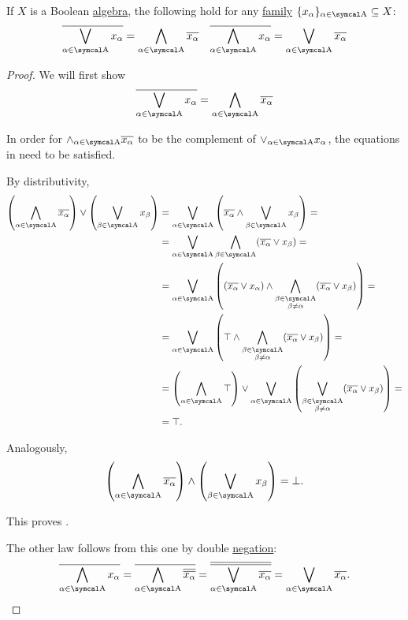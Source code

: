 \begin{theorem}\label{thm:de_morgans_laws}
  If \( X \) is a Boolean \hyperref[def:boolean_algebra]{algebra}, the following hold for any \hyperref[def:indexed_family]{family} \( \{ x_\al \}_{\al \in \CA} \subseteq X \):
  \begin{align*}
    \Ol{\bigvee_{\al \in \CA} x_\al} = \bigwedge_{\al \in \CA} \Ol{x_\al}
    &&
    \Ol{\bigwedge_{\al \in \CA} x_\al} = \bigvee_{\al \in \CA} \Ol{x_\al}
  \end{align*}
\end{theorem}
\begin{proof}
  We will first show
  \begin{equation}\label{thm:de_morgans_laws/equation}
    \Ol{\bigvee_{\al \in \CA} x_\al} = \bigwedge_{\al \in \CA} \Ol{x_\al}
  \end{equation}

  In order for \( \wedge_{\al \in \CA} \Ol{x_\al} \) to be the complement of \( \vee_{\al \in \CA} x_\al \), the equations in  need to be satisfied.

  By distributivity,
  \begin{align*}
    \left( \bigwedge_{\al \in \CA} \Ol{x_\al} \right) \vee \left( \bigvee_{\beta \in \CA} x_\beta \right)
    &=
    \bigvee_{\al \in \CA} \left( \Ol{x_\al} \wedge \bigvee_{\beta \in \CA} x_\beta \right)
    = \\ &=
    \bigvee_{\al \in \CA} \bigwedge_{\beta \in \CA} (\Ol{x_\al} \vee x_\beta)
    = \\ &=
    \bigvee_{\al \in \CA} \left( (\Ol{x_\al} \vee x_\al) \wedge \bigwedge_{\substack{\beta \in \CA \\ \beta \neq \al}} (\Ol{x_\al} \vee x_\beta) \right)
    = \\ &=
    \bigvee_{\al \in \CA} \left( \top \wedge \bigwedge_{\substack{\beta \in \CA \\ \beta \neq \al}} (\Ol{x_\al} \vee x_\beta) \right)
    = \\ &=
    \left( \bigwedge_{\al \in \CA} \top \right) \vee \bigvee_{\al \in \CA} \left( \bigvee_{\substack{\beta \in \CA \\ \beta \neq \al}} (\Ol{x_\al} \vee x_\beta) \right)
    = \\ &=
    \top.
  \end{align*}

  Analogously,
  \begin{equation*}
    \left( \bigwedge_{\al \in \CA} \Ol{x_\al} \right) \wedge \left( \bigvee_{\beta \in \CA} x_\beta \right) = \bot.
  \end{equation*}

  This proves .

  The other law follows from this one by double \hyperref[thm:boolean_algebra_properties]{negation}:
  \begin{equation*}
    \Ol{\bigwedge_{\al \in \CA} x_\al}
    =
    \Ol{\bigwedge_{\al \in \CA} \Ol{\Ol{x_\al}}}
    =
    \Ol{\Ol{\bigvee_{\al \in \CA} \Ol{x_\al}}}
    =
    \bigvee_{\al \in \CA} \Ol{x_\al}.
  \end{equation*}
\end{proof}


